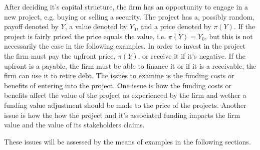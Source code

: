 \documentclass[../main.tex]{subfiles}
\begin{document}
        After deciding it's capital structure, the firm has an opportunity to engage in a new project, e.g. buying or selling a security. The project has a, possibly random, payoff denoted by $Y$, a value denoted by $Y_{0}$, and a price denoted by $\pi(Y)$. If the project is fairly priced the price equals the value, i.e. $\pi(Y) = Y_{0}$, but this is not necessarily the case in the following examples. In order to invest in the project the firm must pay the upfront price, $\pi(Y)$, or receive it if it's negative. If the upfront is a payable, the firm must be able to finance it or if it is a receivable, the firm can use it to retire debt. The issues to examine is the funding costs or benefits of entering into the project. One issue is how the funding costs or benefits affect the value of the project as experienced by the firm and wether a funding value adjustment should be made to the price of the projects. Another issue is how the how the project and it's associated funding impacts the firm value and the value of its stakeholders claims.

        These issues will be assessed by the means of examples in the following sections.
\end{document}
